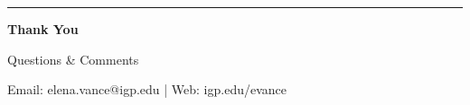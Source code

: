 \documentclass[11pt,aspectratio=169]{beamer}
\begin{document}
\begin{frame}[plain,c]
  \centering
  \vfill
  {\color{cosmicgold}\rule{2cm}{1.5pt}}\par\vspace{0.6cm}
  {\color{cosmicnavy}\bfseries Thank You}\par
  \vspace{0.4cm}
  {\color{cosmicslate}\large Questions \& Comments}\par
  \vspace{1.5cm}
  {\fontsize{8pt}{10pt}\selectfont\color{cosmicslate} Email: elena.vance@igp.edu \quad | \quad Web: igp.edu/evance}
  \vfill
\end{frame}
\end{document}
